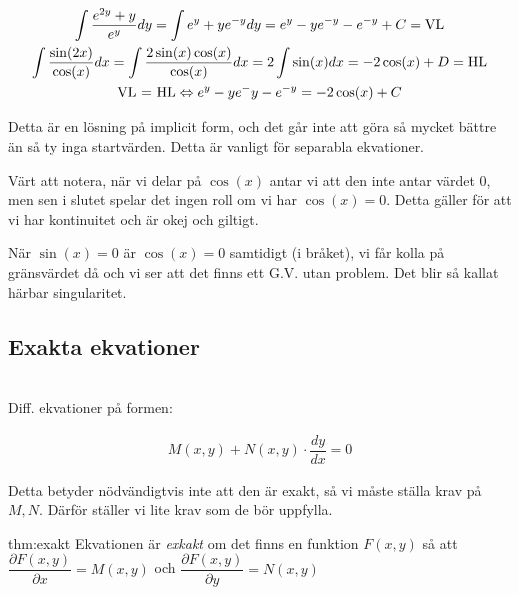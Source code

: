 \begin{equation*}
  \begin{gathered}
    \int\dfrac{e^{2y}+y}{e^y}dy=\int e^y+ye^{-y}dy = e^y -ye^{-y}-e^{-y}+C = \text{VL}\\
    \int\dfrac{\sin(2x)}{\cos(x)}dx = \int\dfrac{2\sin(x)\cos(x)}{\cos(x)}dx = 2\int\sin(x)dx = -2\cos(x)+D = \text{HL}\\
    \text{VL = HL} \Leftrightarrow e^y-ye^-y-e^{-y}=-2\cos(x)+C
  \end{gathered}
\end{equation*}
\par\bigskip
\noindent Detta är en lösning på implicit form, och det går inte att göra så mycket bättre än så ty inga startvärden. Detta är vanligt för separabla ekvationer.
\par\bigskip
\noindent Värt att notera, när vi delar på $\cos(x)$ antar vi att den inte antar värdet 0, men sen i slutet spelar det ingen roll om vi har $\cos(x)=0$. Detta gäller för att vi har kontinuitet och är okej och giltigt.
\par\bigskip
\noindent När $\sin(x)=0$ är $\cos(x)=0$ samtidigt (i bråket), vi får kolla på gränsvärdet då och vi ser att det finns ett G.V. utan problem. Det blir så kallat härbar singularitet.
\par\bigskip

\subsection{Exakta ekvationer}\hfill\\

\noindent Diff. ekvationer på formen:

\begin{equation*}
  \begin{gathered}
    M(x,y)+N(x,y)\cdot\dfrac{dy}{dx}=0
  \end{gathered}
\end{equation*}
\par\bigskip

\noindent Detta betyder nödvändigtvis inte att den är exakt, så vi måste ställa krav på $M, N$. Därför ställer vi lite krav som de bör uppfylla.
\par\bigskip

\begin{theo}{thm:exakt}
  Ekvationen är \textit{exkakt} om det finns en funktion $F(x,y)$ så att $\dfrac{\partial F(x,y)}{\partial x}=M(x,y)$ och $\dfrac{\partial F(x,y)}{\partial y} = N(x,y)$

\end{theo}
\par\bigskip

